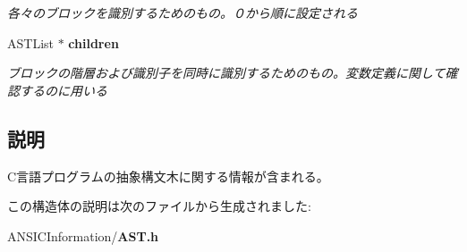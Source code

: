 \begin{DoxyCompactItemize}
\begin{DoxyCompactList}\small\item\em 各々のブロックを識別するためのもの。０から順に設定される \item\end{DoxyCompactList}\item 
ASTList $\ast$ {\bf children}\label{structabstract__syntax__tree_ab5e78b5322a2bab5b0aa21d40522a78b}

\begin{DoxyCompactList}\small\item\em ブロックの階層および識別子を同時に識別するためのもの。変数定義に関して確認するのに用いる \item\end{DoxyCompactList}\end{DoxyCompactItemize}


\subsection{説明}
C言語プログラムの抽象構文木に関する情報が含まれる。 

この構造体の説明は次のファイルから生成されました:\begin{DoxyCompactItemize}
\item 
ANSICInformation/{\bf AST.h}\end{DoxyCompactItemize}
